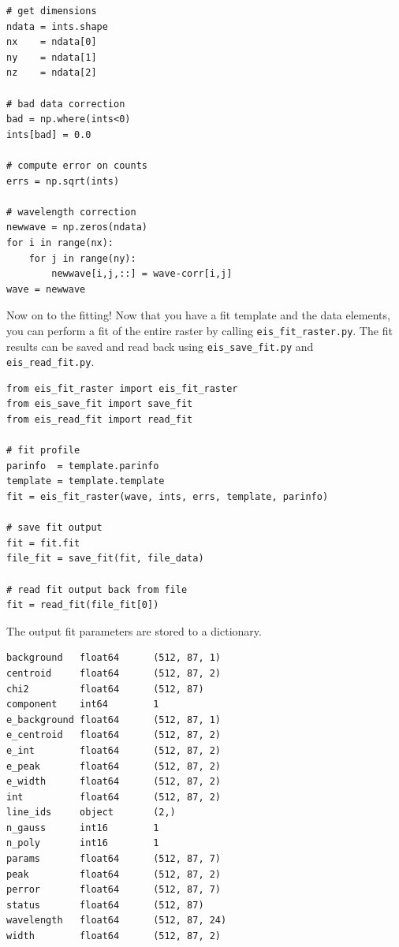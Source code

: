 \begin{lstlisting}
# get dimensions
ndata = ints.shape
nx    = ndata[0]
ny    = ndata[1]
nz    = ndata[2]

# bad data correction
bad = np.where(ints<0)
ints[bad] = 0.0

# compute error on counts
errs = np.sqrt(ints)

# wavelength correction
newwave = np.zeros(ndata)
for i in range(nx):
    for j in range(ny):
        newwave[i,j,::] = wave-corr[i,j]
wave = newwave
\end{lstlisting}

Now on to the fitting! Now that you have a fit template and the data elements, you can perform a fit of the entire raster by calling \verb+eis_fit_raster.py+. The fit results can be saved and read back using \verb+eis_save_fit.py+ and \verb+eis_read_fit.py+.

\begin{lstlisting}
from eis_fit_raster import eis_fit_raster
from eis_save_fit import save_fit
from eis_read_fit import read_fit

# fit profile
parinfo  = template.parinfo
template = template.template
fit = eis_fit_raster(wave, ints, errs, template, parinfo)

# save fit output
fit = fit.fit
file_fit = save_fit(fit, file_data)

# read fit output back from file
fit = read_fit(file_fit[0])
\end{lstlisting}

The output fit parameters are stored to a dictionary.

\begin{lstlisting}
background   float64      (512, 87, 1)
centroid     float64      (512, 87, 2)
chi2         float64      (512, 87)
component    int64        1
e_background float64      (512, 87, 1)
e_centroid   float64      (512, 87, 2)
e_int        float64      (512, 87, 2)
e_peak       float64      (512, 87, 2)
e_width      float64      (512, 87, 2)
int          float64      (512, 87, 2)
line_ids     object       (2,)
n_gauss      int16        1
n_poly       int16        1
params       float64      (512, 87, 7)
peak         float64      (512, 87, 2)
perror       float64      (512, 87, 7)
status       float64      (512, 87)
wavelength   float64      (512, 87, 24)
width        float64      (512, 87, 2)
\end{lstlisting}

